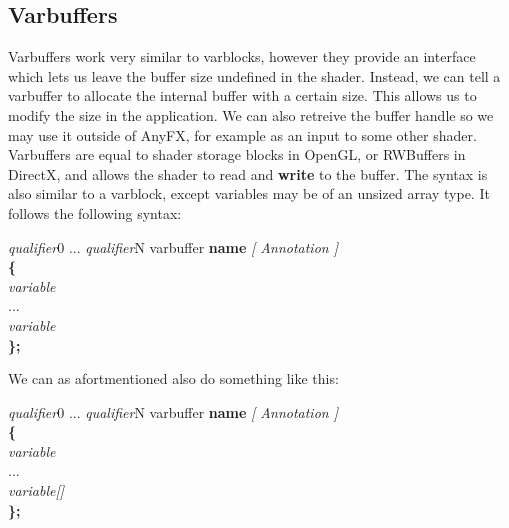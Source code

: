 \documentclass{article}
\newcommand{\SyntaxBox}[1]
{	
	\begin{center}
	\colorbox{orange!60}
	{
		\begin{minipage}{\linewidth}
		\hfill
		\begin{tabbing}
		#1
		\end{tabbing}
		\end{minipage}
	}
	\end{center}
}
\begin{document}
\begin{table}[hp]
\centering
\caption{Varblock qualifiers}
\label{table:varblockqualifiers}
\end{table}

\subsection{Varbuffers}
Varbuffers work very similar to varblocks, however they provide an interface which lets us leave the buffer size undefined in the shader. Instead, we can tell a varbuffer to allocate the internal buffer with a certain size. This allows us to modify the size in the application. We can also retreive the buffer handle so we may use it outside of AnyFX, for example as an input to some other shader. Varbuffers are equal to shader storage blocks in OpenGL, or RWBuffers in DirectX, and allows the shader to read and \textbf{write} to the buffer. The syntax is also similar to a varblock, except variables may be of an unsized array type. It follows the following syntax:

\SyntaxBox
{
	\textit{qualifier}0 ... \textit{qualifier}N varbuffer \textbf{name} \textit{[ Annotation ]} \\
	\textbf{\{} \= \\
	\>	\textit{variable} \\
	\>	...	\\
	\>	\textit{variable} \\
	\textbf{\};}
}

We can as afortmentioned also do something like this:

\SyntaxBox
{
	\textit{qualifier}0 ... \textit{qualifier}N varbuffer \textbf{name} \textit{[ Annotation ]} \\
	\textbf{\{} \= \\
	\>	\textit{variable} \\
	\>	...	\\
	\>	\textit{variable[]} \\
	\textbf{\};}
}
\end{document}
